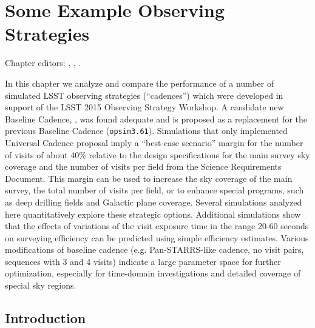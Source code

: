 
\chapter[Some Example Observing Strategies]{Some Example Observing Strategies}
\def\chpname{cadexp}\label{chp:\chpname}

Chapter editors:
,
,
.


 In this chapter 
we analyze and compare the performance of a number of simulated LSST
observing strategies (``cadences'')
which were developed in support of the LSST 2015 Observing
Strategy Workshop.  A candidate new Baseline Cadence,
, was found adequate and is proposed as  a
replacement for the previous Baseline Cadence (\texttt{opsim3.61}).
Simulations that only implemented Universal Cadence proposal imply a
``best-case 
scenario'' margin for the number of visits of about 40\% relative to the design
specifications for the main survey sky coverage and the number of
visits per field from the Science Requirements Document. This margin
can be used to increase the sky coverage of the main survey, the total
number of visits per field, or to enhance special programs, such as
deep drilling fields and Galactic plane coverage. Several  simulations
analyzed here quantitatively explore these strategic options.
Additional simulations show that the effects of variations of the
visit exposure time in the  range 20-60 seconds on surveying
efficiency can be predicted using simple efficiency estimates. Various
modifications of baseline cadence (e.g. Pan-STARRS-like cadence,  no
visit pairs, sequences with 3 and 4 visits) indicate a large parameter
space for further optimization, especially for time-domain
investigations and detailed coverage of special sky regions.


\section{Introduction}
\def\secname{cadexp:intro}\label{sec:\secname}

